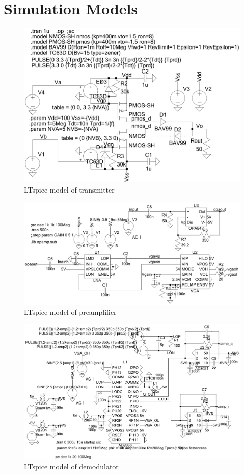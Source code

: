 \chapter{Simulation Models}
\begin{figure}[htbp]
	\centering
	\includegraphics[width=.9\textwidth]{Figures/appendix/ltspice_transmitter.pdf}
	\caption{LTspice model of transmitter}
	\label{fig:app_ltspice_transmitter}
\end{figure}
\begin{figure}[htbp]
	\centering
	\includegraphics[width=.9\textwidth]{Figures/appendix/ltspice_preamp.pdf}
	\caption{LTspice model of preamplifier}
	\label{fig:app_ltspice_preamp}
\end{figure}
\begin{figure}[htbp]
	\centering
	\includegraphics[width=.9\textwidth]{Figures/appendix/ltspice_demod.pdf}
	\caption{LTspice model of demodulator}
	\label{fig:app_ltspice_demod}
\end{figure}

